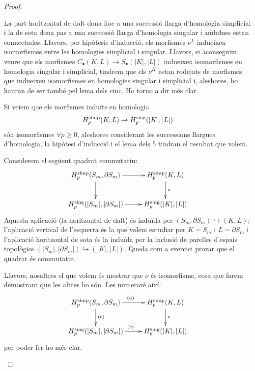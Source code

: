 \documentclass[../main.tex]{subfiles}
\begin{document}
\begin{proof}
\begin{enumerate}[(1)]
    La part horitzontal de dalt dona lloc a una successió llarga d'homologia simplicial i la de sota dona pas a una successió llarga d'homologia singular i ambdues estan connectades. Llavors, per hipòtesis d'inducció, els morfismes $\nu^L$ indueixen isomorfismes entre les homologies simplicial i singular. Llavors, si aconseguim veure que els morfismes $C_\bullet(K,L)\rightarrow S_\bullet(|K|,|L|)$ indueixen isomorfismes en homologia singular i simplicial, tindrem que els $\nu^K$ estan rodejats de morfismes que indueixen isomorfismes en homologies singular i simplicial i, aleshores, ho hauran de ser també pel lema dels cinc. Ho torno a dir més clar.
    
    Si veiem que els morfismes induïts en homologia
    \begin{equation}
        \notag
        H_p^{\mathrm{simp}}(K,L)\rightarrow H_p^{\mathrm{sing}}(|K|,|L|)
    \end{equation}
    són isomorfismes $\forall p\geq 0$, aleshores considerant les successions llargues d'homologia, la hipòtesi d'inducció i el lema dels 5 tindran el resultat que volem.
    
    Considerem el següent quadrat commutatiu:
    \begin{equation}
        \notag
        \xymatrix{
        H_p^{\mathrm{simp}}(S_m,\partial S_m)\ar[r]\ar[d] & H_p^{\mathrm{simp}}(K,L)\ar[d]^\nu\\
        H_p^{\mathrm{sing}}(|S_m|,|\partial S_m|)\ar[r] & H_p^{\mathrm{sing}}(|K|, |L|)
        }
    \end{equation}
    Aquesta aplicació (la horitzontal de dalt) és induïda per $(S_m,\partial S_m)\hookrightarrow(K,L)$; l'aplicació vertical de l'esquerra és la que volem estudiar per $K = S_m$ i $L = \partial S_m$ i l'aplicació horitzontal de sota és la induïda per la inclusió de parelles d'espais topològics $(|S_m|,|\partial S_m|)\hookrightarrow (|K|,|L|)$. Queda com a exercici provar que el quadrat és commutatiu.
    
    Llavors, nosaltres el que volem és mostrar que $\nu$ és isomorfisme, cosa que farem demostrant que les altres ho són. Les numeraré així:
    \begin{equation}
        \notag
        \xymatrix{
        H_p^{\mathrm{simp}}(S_m,\partial S_m)\ar[r]^{(a)}\ar[d]^{(b)} & H_p^{\mathrm{simp}}(K,L)\ar[d]^\nu\\
        H_p^{\mathrm{sing}}(|S_m|,|\partial S_m|)\ar[r]^{(c)} & H_p^{\mathrm{sing}}(|K|, |L|)
        }
    \end{equation}
    per poder fer-ho més clar.
    

\end{enumerate}
\end{proof}
\end{document}
